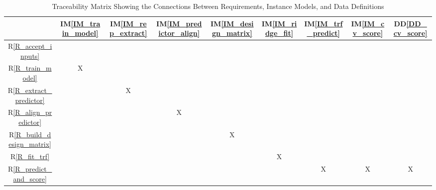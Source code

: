 \documentclass[12pt]{article}
\newcommand{\ddref}[1]{DD\ref{#1}}
\newcommand{\iref}[1]{IM\ref{#1}}
\newcommand{\rref}[1]{R\ref{#1}}
\begin{document}
\begin{table}[h!]
\centering
\renewcommand{\arraystretch}{1.1}
\begin{tabular}{|c|c|c|c|c|c|c|c|c|}
\hline
 & \iref{IM_train_model} & \iref{IM_rep_extract} & \iref{IM_predictor_align} &
 \iref{IM_design_matrix} & \iref{IM_ridge_fit} & \iref{IM_trf_predict} & \iref{IM_cv_score} & \ddref{DD_cv_score} \\
\hline
\rref{R_accept_inputs}      &   &   &   &   &   &   &   &   \\ \hline
\rref{R_train_model}        & X &   &   &   &   &   &   &   \\ \hline
\rref{R_extract_predictor}  &   & X &   &   &   &   &   &   \\ \hline
\rref{R_align_predictor}    &   &   & X &   &   &   &   &   \\ \hline
\rref{R_build_design_matrix}&   &   &   & X &   &   &   &   \\ \hline
\rref{R_fit_trf}            &   &   &   &   & X &   &   &   \\ \hline
\rref{R_predict_and_score}  &   &   &   &   &   & X & X & X \\ \hline
\end{tabular}
\caption{Traceability Matrix Showing the Connections Between Requirements, Instance Models, and Data Definitions}
\label{Table:R_trace}
\end{table}




















\end{document}
